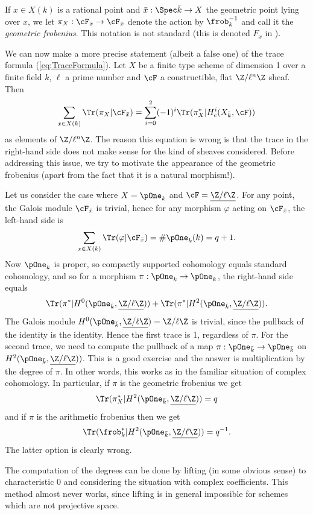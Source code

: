\begin{defi}
If $x \in X(k)$ is a rational point and $\bar x : \Spec \bar k \to X$ the geometric point lying over $x$, we let $\pi_X : \cF_{\bar x} \to \cF_{\bar x}$ denote the action by $\frob_k^{-1}$ and call it the \emph{geometric frobenius}. This notation is not standard (this is denoted $F_x$ in \cite{SGA4.5}).
\end{defi}

We can now make a more precise statement (albeit a false one) of the trace formula (\ref{eq:TraceFormula}). Let $X$ be a finite type scheme of dimension 1 over a finite field $k$, $\ell$ a prime number and $\cF$ a constructible, flat $\Z/\ell^n\Z$ sheaf. Then
$$
\sum_{x \in X(k)} \Tr(\pi_X | \cF_{\bar x}) = \sum_{i=0}^2 (-1)^i \Tr(\pi_X^* | H^i_c(X_{\bar k}, \cF))
$$
as elements of $\Z/\ell^n\Z$. The reason this equation is wrong is that the trace in the right-hand side does not make sense for the kind of sheaves considered. Before addressing this issue, we try to motivate the appearance of the geometric frobenius (apart from the fact that it is a natural morphism!). 

Let us consider the case where $X = \pOne_k$ and $\cF = \underline{\Z/\ell\Z}$. For any point, the Galois module $\cF_{\bar x}$ is trivial, hence for any morphism $\varphi$ acting on $\cF_{\bar x}$, the left-hand side is
$$
\sum_{x \in X(k)} \Tr(\varphi | \cF_{\bar x}) = \#\pOne_k(k) = q+1.
$$
Now $\pOne_k$ is proper, so compactly supported cohomology equals standard cohomology, and so for a morphism $\pi : \pOne_k \to \pOne_k$, the right-hand side equals
$$
\Tr(\pi^* | H^0 (\pOne_{\bar k}, \underline{\Z/\ell\Z})) + \Tr(\pi^* | H^2 (\pOne_{\bar k}, \underline{\Z/\ell\Z})).
$$
The Galois module $H^0 (\pOne_{\bar k}, \underline{\Z/\ell\Z}) = \Z/\ell\Z$ is trivial, since the pullback of the identity is the identity. Hence the first trace is 1, regardless of $\pi$. For the second trace, we need to compute the pullback of a map $\pi: \pOne_{\bar k} \to \pOne_{\bar k}$ on $H^2 (\pOne_{\bar k}, \underline{\Z/\ell\Z}))$. This is a good exercise and the answer is multiplication by the degree of $\pi$. In other words, this works as in the familiar situation of complex cohomology. In particular, if $\pi$ is the geometric frobenius we get 
$$
\Tr(\pi_X^* | H^2 (\pOne_{\bar k}, \underline{\Z/\ell\Z})) = q
$$ 
and if $\pi$ is the arithmetic frobenius then we get 
$$
\Tr(\frob_k^* | H^2 (\pOne_{\bar k}, \underline{\Z/\ell\Z})) = q^{-1}.
$$
The latter option is clearly wrong. 

\begin{remark}
The computation of the degrees can be done by lifting (in some obvious sense) to characteristic 0 and considering the situation with complex coefficients. This method almost never works, since lifting is in general impossible for schemes which are not projective space.
\end{remark}

